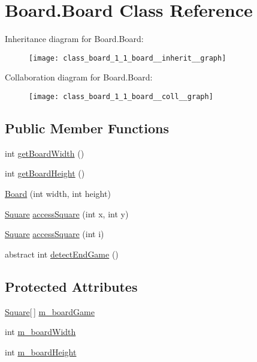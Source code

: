 \hypertarget{class_board_1_1_board}{}\section{Board.\+Board Class Reference}
\label{class_board_1_1_board}


Inheritance diagram for Board.\+Board\+:\nopagebreak
\begin{figure}[H]
\begin{center}
\leavevmode
\texttt{[image: class\_board\_1\_1\_board\_\_inherit\_\_graph]}
\end{center}
\end{figure}


Collaboration diagram for Board.\+Board\+:\nopagebreak
\begin{figure}[H]
\begin{center}
\leavevmode
\texttt{[image: class\_board\_1\_1\_board\_\_coll\_\_graph]}
\end{center}
\end{figure}
\subsection*{Public Member Functions}
\begin{DoxyCompactItemize}
\item 
int \hyperlink{class_board_1_1_board_a2eac3ef13d90ea0dfdc2c198bcab030d}{get\+Board\+Width} ()
\item 
int \hyperlink{class_board_1_1_board_a76b63d4d319e6a0f9f574a3fa8e5d00b}{get\+Board\+Height} ()
\item 
\hyperlink{class_board_1_1_board_a346819dc6f781a6a6c03a2bf8219e1e0}{Board} (int width, int height)
\item 
\hyperlink{class_square_1_1_square}{Square} \hyperlink{class_board_1_1_board_a279f8936c2da2be7c0c12d61212a7591}{access\+Square} (int x, int y)
\item 
\hyperlink{class_square_1_1_square}{Square} \hyperlink{class_board_1_1_board_aa2e9404b4c5fa4b7c22376610f172da8}{access\+Square} (int i)
\item 
abstract int \hyperlink{class_board_1_1_board_a1e4af7a26127d7f715c9df3d058ac97e}{detect\+End\+Game} ()
\end{DoxyCompactItemize}
\subsection*{Protected Attributes}
\begin{DoxyCompactItemize}
\item 
\hyperlink{class_square_1_1_square}{Square}\mbox{[}$\,$\mbox{]} \hyperlink{class_board_1_1_board_aede8ecf481e3981e0ec04d7bd3520bea}{m\+\_\+board\+Game}
\item 
int \hyperlink{class_board_1_1_board_a811ddc59658729b3cdb0a2db75465334}{m\+\_\+board\+Width}
\item 
int \hyperlink{class_board_1_1_board_a4a513d0963fd4e135fac9d121aea3a98}{m\+\_\+board\+Height}
\end{DoxyCompactItemize}


